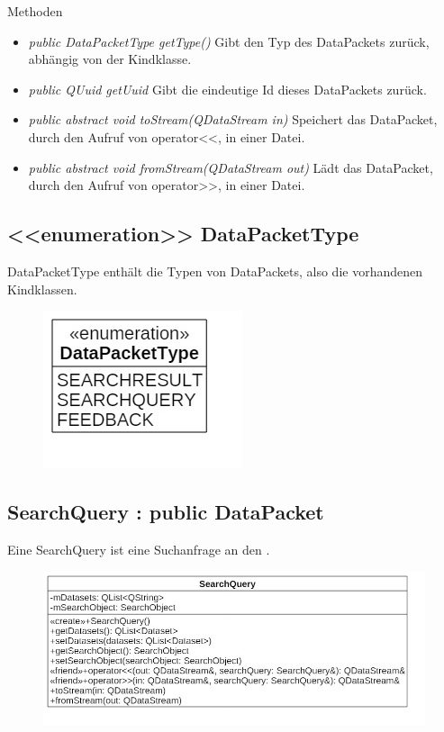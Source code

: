 Methoden
\begin{itemize}
\item \textit{public DataPacketType getType()} Gibt den Typ des DataPackets zurück, abhängig von der Kindklasse.
\item\textit{public QUuid getUuid} Gibt die eindeutige Id dieses DataPackets zurück.
\item \textit{public abstract void toStream(QDataStream in)} Speichert das DataPacket, durch den Aufruf von operator<<, in einer Datei.
\item \textit{public abstract void fromStream(QDataStream out)} Lädt das DataPacket, durch den Aufruf von operator>>, in einer Datei.
\end{itemize}

\pagebreak

\subsection*{<<enumeration>> DataPacketType}
DataPacketType enthält die Typen von DataPackets, also die vorhandenen Kindklassen.

\begin{figure}[H]
\centering
\includegraphics[scale=0.5]{img/Klassendiagramm/Klassen/Model/DataPacketType}
\label{fig:dataPacketType}
\end{figure}

\subsection*{SearchQuery : public DataPacket}
Eine SearchQuery ist eine Suchanfrage an den .

\begin{figure}[H]
\centering
\includegraphics[scale=0.5]{img/Klassendiagramm/Klassen/Model/SearchQuery}
\label{fig:searchQuery}
\end{figure}

